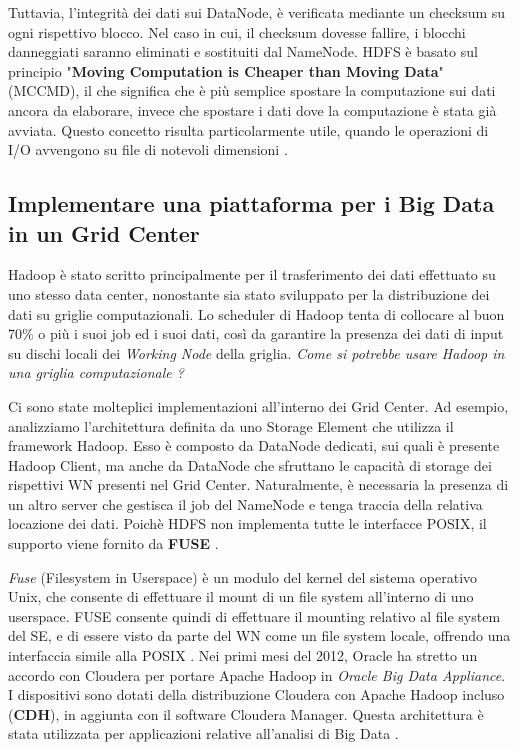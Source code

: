\documentclass[11pt]{article}
\begin{document}
\begin{enumerate}
	Tuttavia, l'integrità dei dati sui DataNode, è verificata mediante un checksum su ogni rispettivo blocco. Nel caso in cui, il checksum dovesse fallire, i blocchi danneggiati saranno eliminati e sostituiti dal NameNode.
	HDFS è basato sul principio "\textbf{Moving Computation is Cheaper than Moving Data}" (MCCMD), il che significa che è più semplice spostare la computazione sui dati ancora da elaborare, invece che spostare i dati dove la computazione è stata già avviata. Questo concetto risulta particolarmente utile, quando le operazioni di I/O avvengono su file di notevoli dimensioni \cite{hadoop}.
\end{enumerate} 

\subsection{Implementare una piattaforma per i Big Data in un Grid Center}
Hadoop è stato scritto principalmente per il trasferimento dei dati effettuato su uno stesso data center, nonostante sia stato sviluppato per la distribuzione dei dati su griglie computazionali.
Lo scheduler di Hadoop tenta di collocare al buon 70\% o più i suoi job ed i suoi dati, così da garantire la presenza dei dati di input su dischi locali dei \emph{Working Node} della griglia.
\emph{Come si potrebbe usare Hadoop in una griglia computazionale ?} \cite{hadoop}

Ci sono state molteplici implementazioni all'interno dei Grid Center. Ad esempio, analizziamo l'architettura definita da uno Storage Element che utilizza il framework Hadoop. Esso è composto da DataNode dedicati, sui quali è presente Hadoop Client, ma anche da DataNode che sfruttano le capacità di storage dei rispettivi WN presenti nel Grid Center. Naturalmente, è necessaria la presenza di un altro server che gestisca il job del NameNode e tenga traccia della relativa locazione dei dati.
Poichè HDFS non implementa tutte le interfacce POSIX, il supporto viene fornito da \textbf{FUSE} \cite{fuse}. 

\emph{Fuse} (Filesystem in Userspace) è un modulo del kernel del sistema operativo Unix, che consente di effettuare il mount di un file system all'interno di uno userspace. FUSE consente quindi di effettuare il mounting relativo al file system del SE, e di essere visto da parte del WN come un file system locale, offrendo una interfaccia simile alla POSIX \cite{fuse}.
Nei primi mesi del 2012, Oracle ha stretto un accordo con Cloudera per portare Apache Hadoop in \emph{Oracle Big Data Appliance}. I dispositivi sono dotati della distribuzione Cloudera con Apache Hadoop incluso (\textbf{CDH}), in aggiunta con il software Cloudera Manager. Questa architettura è stata utilizzata per applicazioni relative all'analisi di Big Data \cite{fuse}.
\end{document}
